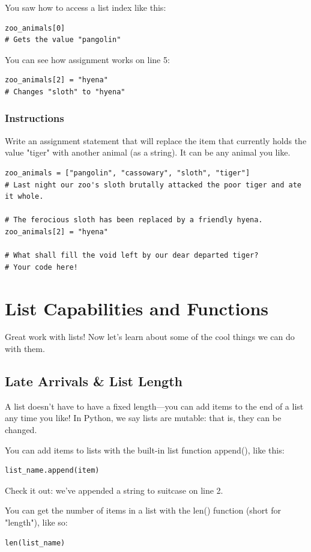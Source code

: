 \documentclass[12pt,a4paper,final,twoside,onecolumn,titlepage]{book}
\begin{document}
You saw how to access a list index like this:
\begin{lstlisting}
zoo_animals[0]
# Gets the value "pangolin"
\end{lstlisting}
You can see how assignment works on line 5:
\begin{lstlisting}
zoo_animals[2] = "hyena"
# Changes "sloth" to "hyena"
\end{lstlisting}

\subsubsection{Instructions}

Write an assignment statement that will replace the item that currently holds the value "tiger" with another animal (as a string). It can be any animal you like.
\begin{lstlisting}
zoo_animals = ["pangolin", "cassowary", "sloth", "tiger"]
# Last night our zoo's sloth brutally attacked the poor tiger and ate it whole.

# The ferocious sloth has been replaced by a friendly hyena.
zoo_animals[2] = "hyena"

# What shall fill the void left by our dear departed tiger?
# Your code here!
\end{lstlisting}

\section{List Capabilities and Functions}
    Great work with lists! Now let's learn about some of the cool things we can do with them.
\subsection{Late Arrivals \& List Length}

A list doesn't have to have a fixed length—you can add items to the end of a list any time you like! In Python, we say lists are mutable: that is, they can be changed.

You can add items to lists with the built-in list function append(), like this:
\begin{lstlisting}
list_name.append(item)
\end{lstlisting}
Check it out: we've appended a string to suitcase on line 2.

You can get the number of items in a list with the len() function (short for "length"), like so:
\begin{lstlisting}
len(list_name)
\end{lstlisting}
\end{document}
